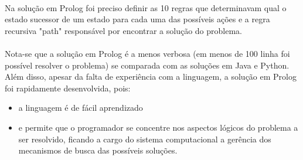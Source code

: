 \documentclass[12pt,a4paper]{article}
\begin{document}
\paragraph{}

Na solução em Prolog foi preciso definir as 10 regras que determinavam qual o estado sucessor de um estado para cada uma das possíveis ações e a regra recursiva "path" responsável por encontrar a solução do problema.

\paragraph{}

Nota-se que a solução em Prolog é a menos verbosa (em menos de 100 linha foi possível resolver o problema) se comparada com as soluções em Java e Python. Além disso, apesar da falta de experiência com a linguagem, a solução em Prolog foi rapidamente desenvolvida, pois:

\begin{itemize}
\item a linguagem é de fácil aprendizado
\item e permite que o programador se concentre nos aspectos lógicos do problema a ser resolvido, ficando a cargo do sistema computacional a gerência dos mecanismos de busca das possíveis soluções.
\end{itemize}
\end{document}

